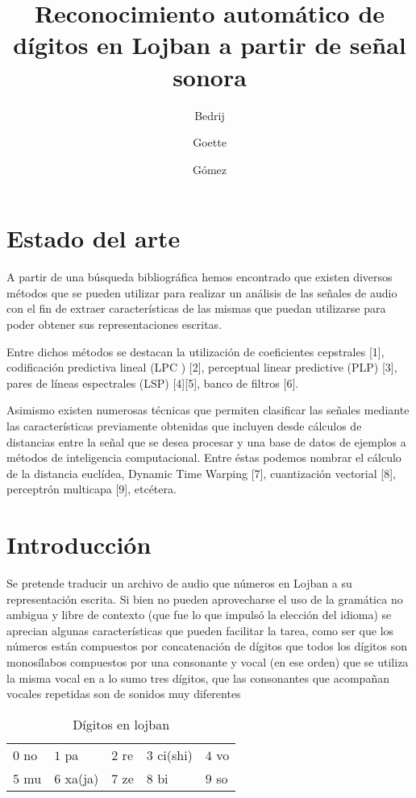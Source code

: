 \documentclass[a4paper]{article}
\title{Reconocimiento automático de dígitos en Lojban a partir de señal sonora}
\author{Bedrij \and Goette \and Gómez}
\date{}
\begin{document}
	\maketitle
	\section{Estado del arte}
		A partir de una búsqueda bibliográfica hemos encontrado que existen
		diversos métodos que se pueden utilizar para realizar un análisis de
		las señales de audio con el fin de extraer características de las mismas
		que puedan utilizarse para poder obtener sus representaciones escritas.

		Entre dichos métodos se destacan la utilización de coeficientes
		cepstrales [1], codificación predictiva lineal (LPC ) [2], perceptual
		linear predictive (PLP) [3], pares de líneas espectrales (LSP) [4][5],
		banco de filtros [6].


		Asimismo existen numerosas técnicas que permiten clasificar las señales
		mediante las características previamente obtenidas que incluyen desde
		cálculos de distancias entre la señal que se desea procesar y una base
		de datos de ejemplos a métodos de inteligencia computacional. Entre
		éstas podemos nombrar el cálculo de la distancia euclídea, Dynamic
		Time Warping [7],  cuantización vectorial [8], perceptrón multicapa
		[9], etcétera.

	\section{Introducción}
		Se pretende traducir un archivo de audio que números en Lojban
		a su representación escrita.
		Si bien no pueden aprovecharse el uso de la gramática
		no ambigua y libre de contexto (que fue lo que impulsó la
		elección del idioma) se aprecian algunas características que
		pueden facilitar la tarea, como ser que los números están
		compuestos por concatenación de dígitos que todos los dígitos
		son monosílabos compuestos por una consonante y vocal (en ese
		orden) que se utiliza la misma vocal en a lo sumo tres dígitos,
		que las consonantes que acompañan vocales repetidas son de
		sonidos muy diferentes

		\begin{table}[h]
			\center
			\begin{tabular}{lllll}
				$0$ no & $1$ pa & $2$ re & $3$ ci(shi) & $4$ vo\\
				$5$ mu & $6$ xa(ja) & $7$ ze & $8$ bi & $9$ so\\
			\end{tabular}
			\caption{Dígitos en lojban}
		\end{table}
\end{document}
